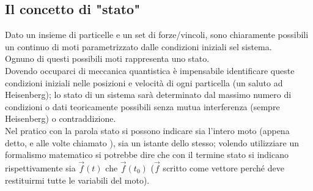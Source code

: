 \documentclass[../../../../Meccanica_quantistica]{subfiles}
\begin{document}
\subsection{Il concetto di "stato"}
    \label{subsec:il-concetto-di-stato}
    Dato un insieme di particelle e un set di forze/vincoli, sono
    chiaramente possibili un continuo di moti parametrizzato dalle
    condizioni iniziali sel sistema. \\
    Ognuno di questi possibili moti rappresenta uno stato. \\
    Dovendo occuparci di meccanica quantistica è impensabile
    identificare queste condizioni iniziali nelle posizioni e
    velocità di ogni particella (un saluto ad Heisenberg); lo stato
    di un sistema sarà determinato dal massimo numero di condizioni
    o dati teoricamente possibili senza mutua interferenza (sempre
    Heisenberg) o contraddizione. \\
    Nel pratico con la parola stato si possono indicare sia
    l'intero moto (appena detto, e alle volte chiamato ), sia un istante dello stesso;
    volendo utilizziare un formalismo matematico si potrebbe dire
    che con il termine stato si indicano rispettivamente sia
    $\vec{f}(t)$ che $\vec{f}(t_0)$ ($\vec{f}$ scritto come vettore
    perché deve restituirmi tutte le variabili del moto).
\end{document}
